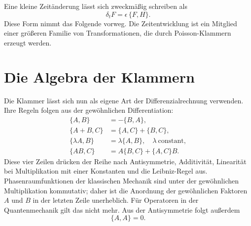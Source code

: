 \begin{classroomqa}
\end{classroomqa}

Eine kleine Zeitänderung lässt sich zweckmäßig schreiben als
\begin{equation}
  \delta_t F=\epsilon\,\{F,H\}.
  \label{eq:l8-small-time-step}
\end{equation}
Diese Form nimmt das Folgende vorweg. Die Zeitentwicklung ist ein Mitglied einer größeren Familie von Transformationen, die durch Poisson-Klammern erzeugt werden.

\section{Die Algebra der Klammern}

Die Klammer lässt sich nun als eigene Art der Differenzialrechnung verwenden. Ihre Regeln folgen aus der gewöhnlichen Differentiation:
\begin{align}
  \{A,B\}&=-\{B,A\}, \label{eq:l8-antisymmetry}\\
  \{A+B,C\}&=\{A,C\}+\{B,C\}, \label{eq:l8-additivity}\\
  \{\lambda A,B\}&=\lambda\{A,B\},
    \quad \lambda\ \text{constant}, \label{eq:l8-scalar-rule}\\
  \{AB,C\}&=A\{B,C\}+\{A,C\}B. \label{eq:l8-leibniz}
\end{align}
Diese vier Zeilen drücken der Reihe nach Antisymmetrie, Additivität, Linearität bei Multiplikation mit einer Konstanten und die Leibniz-Regel aus. Phasenraumfunktionen der klassischen Mechanik sind unter der gewöhnlichen Multiplikation kommutativ; daher ist die Anordnung der gewöhnlichen Faktoren \(A\) und \(B\) in der letzten Zeile unerheblich. Für Operatoren in der Quantenmechanik gilt das nicht mehr. Aus der Antisymmetrie folgt außerdem
\begin{equation}
  \{A,A\}=0.
  \label{eq:l8-self-bracket}
\end{equation}


